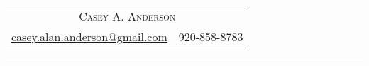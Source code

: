 %
%

\begin{center}
    \begin{minipage}{\textwidth}
	\begin{center}
	    \begin{tabular}{r|l}
		\multicolumn{2}{c}{\Huge \textsc{Casey A. Anderson}} \vspace{2mm} \\
	 	\href{mailto:casey.alan.anderson@gmail.com}{casey.alan.anderson@gmail.com}& 920-858-8783 \\
	    \end{tabular}
	\end{center}
    \end{minipage}
\end{center}

\rule{\textwidth}{0.1mm}


